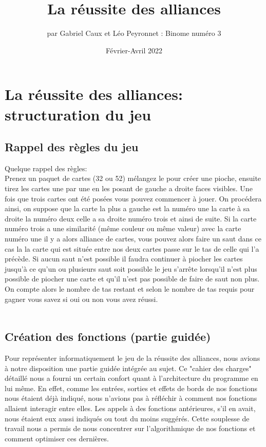 \documentclass[10pt,a4paper,french,titlepage]{article}
\author{par Gabriel Caux et Léo Peyronnet : Binome numéro 3}
\title{La réussite des alliances}
\date{Février-Avril 2022}
\begin{document}
\maketitle
\tableofcontents
\section{La réussite des alliances: structuration du jeu}
\subsection{Rappel des règles du jeu}
Quelque rappel des règles:\\
Prenez un paquet de cartes (32 ou 52) mélangez le pour créer une pioche, ensuite tirez les cartes une par une en les posant de gauche a droite faces visibles. Une fois que trois cartes ont été posées vous pouvez commencer à jouer. On procédera ainsi, on suppose que la carte la plus a gauche est la numéro une la carte à sa droite la numéro deux celle a sa droite numéro trois et ainsi de suite. Si la carte numéro trois a une similarité (même couleur ou même valeur) avec la carte numéro une il y a alors alliance de cartes, vous pouvez alors faire un saut dans ce cas la la carte qui est située entre nos deux cartes passe sur le tas de celle qui l'a précède. Si aucun saut n'est possible il faudra continuer à piocher les cartes jusqu'à ce qu'un ou plusieurs saut soit possible le jeu s'arrête lorsqu'il n'est plus possible de piocher une carte et qu'il n'est pas possible de faire de saut non plus. On compte alors le nombre de tas restant et selon le nombre de tas requis pour gagner vous savez si oui ou non vous avez réussi.\\\\

\subsection{Création des fonctions (partie guidée)}
Pour représenter informatiquement le jeu de la réussite des alliances, nous avions à notre disposition une partie guidée intégrée au sujet.
Ce "cahier des charges" détaillé nous a fourni un certain confort quant à l'architecture du programme en lui même. En effet, comme les entrées, 
sorties et effets de bords de nos fonctions nous étaient déjà indiqué, nous n'avions pas à réfléchir à comment nos fonctions allaient interagir entre elles. Les appels à des fonctions antérieures, s'il en avait, nous étaient eux aussi indiqués ou tout du moins suggérés. Cette souplesse de travail nous
a permis de nous concentrer sur l'algorithmique de nos fonctions et comment optimiser ces dernières.\\
\end{document}
